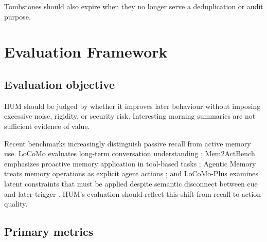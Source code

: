 \documentclass[11pt,a4paper]{article}
\begin{document}
Tombstones should also expire when they no longer serve a deduplication or audit purpose.

\section{Evaluation Framework}

\subsection{Evaluation objective}

HUM should be judged by whether it improves later behaviour without imposing excessive noise, rigidity, or security risk. Interesting morning summaries are not sufficient evidence of value.

Recent benchmarks increasingly distinguish passive recall from active memory use. LoCoMo evaluates long-term conversation understanding \cite{maharana2024}; Mem2ActBench emphasizes proactive memory application in tool-based tasks \cite{shen2026}; Agentic Memory treats memory operations as explicit agent actions \cite{yu2026}; and LoCoMo-Plus examines latent constraints that must be applied despite semantic disconnect between cue and later trigger \cite{li2026}. HUM's evaluation should reflect this shift from recall to action quality.

\subsection{Primary metrics}
\end{document}

